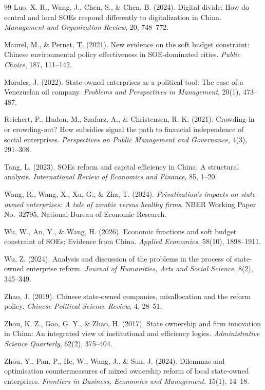 \documentclass[11pt,a4paper]{ctexart}
\begin{document}
\begin{thebibliography}{99}
 Luo, X. R., Wang, J., Chen, S., \& Chen, B. (2024). Digital divide: How do central and local SOEs respond differently to digitalization in China. \emph{Management and Organization Review}, 20, 748--772.

 Maurel, M., \& Pernet, T. (2021). New evidence on the soft budget constraint: Chinese environmental policy effectiveness in SOE-dominated cities. \emph{Public Choice}, 187, 111--142.

 Morales, J. (2022). State-owned enterprises as a political tool: The case of a Venezuelan oil company. \emph{Problems and Perspectives in Management}, 20(1), 473--487.

 Reichert, P., Hudon, M., Szafarz, A., \& Christensen, R. K. (2021). Crowding-in or crowding-out? How subsidies signal the path to financial independence of social enterprises. \emph{Perspectives on Public Management and Governance}, 4(3), 291--308.

 Tang, L. (2023). SOEs reform and capital efficiency in China: A structural analysis. \emph{International Review of Economics and Finance}, 85, 1--20.

 Wang, R., Wang, X., Xu, G., \& Zha, T. (2024). \emph{Privatization's impacts on state-owned enterprises: A tale of zombie versus healthy firms}. NBER Working Paper No.~32795, National Bureau of Economic Research.

 Wu, W., An, Y., \& Wang, H. (2026). Economic functions and soft budget constraint of SOEs: Evidence from China. \emph{Applied Economics}, 58(10), 1898--1911.

 Wu, Z. (2024). Analysis and discussion of the problems in the process of state-owned enterprise reform. \emph{Journal of Humanities, Arts and Social Science}, 8(2), 345--349.

 Zhao, J. (2019). Chinese state-owned companies, misallocation and the reform policy. \emph{Chinese Political Science Review}, 4, 28--51.

 Zhou, K. Z., Gao, G. Y., \& Zhao, H. (2017). State ownership and firm innovation in China: An integrated view of institutional and efficiency logics. \emph{Administrative Science Quarterly}, 62(2), 375--404.

 Zhou, Y., Pan, P., He, W., Wang, J., \& Sun, J. (2024). Dilemmas and optimisation countermeasures of mixed ownership reform of local state-owned enterprises. \emph{Frontiers in Business, Economics and Management}, 15(1), 14--18.

\end{thebibliography}
\end{document}
